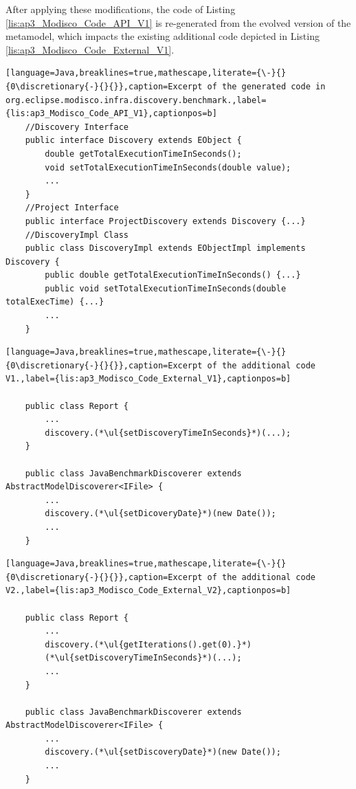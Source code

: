 After applying these modifications, the code of Listing \ref{lis:ap3_Modisco_Code_API_V1} is re-generated from the evolved version of the metamodel, which impacts the existing additional code depicted in Listing \ref{lis:ap3_Modisco_Code_External_V1}. 

\begin{lstlisting}[language=Java,breaklines=true,mathescape,literate={\-}{}{0\discretionary{-}{}{}},caption=Excerpt of the generated code in org.eclipse.modisco.infra.discovery.benchmark.,label={lis:ap3_Modisco_Code_API_V1},captionpos=b]
	//Discovery Interface
	public interface Discovery extends EObject {
		double getTotalExecutionTimeInSeconds();
		void setTotalExecutionTimeInSeconds(double value);
		...
	}
	//Project Interface
	public interface ProjectDiscovery extends Discovery {...}
	//DiscoveryImpl Class
	public class DiscoveryImpl extends EObjectImpl implements Discovery {
		public double getTotalExecutionTimeInSeconds() {...}
		public void setTotalExecutionTimeInSeconds(double totalExecTime) {...}
		...
	}
\end{lstlisting}
\begin{lstlisting}[language=Java,breaklines=true,mathescape,literate={\-}{}{0\discretionary{-}{}{}},caption=Excerpt of the additional code V1.,label={lis:ap3_Modisco_Code_External_V1},captionpos=b]
	
	public class Report {
		...
		discovery.(*\ul{setDiscoveryTimeInSeconds}*)(...);
	}
	
	public class JavaBenchmarkDiscoverer extends AbstractModelDiscoverer<IFile> {
		...
		discovery.(*\ul{setDicoveryDate}*)(new Date());
		...
	} 
\end{lstlisting}


\begin{lstlisting}[language=Java,breaklines=true,mathescape,literate={\-}{}{0\discretionary{-}{}{}},caption=Excerpt of the additional code V2.,label={lis:ap3_Modisco_Code_External_V2},captionpos=b]
	
	public class Report {
		...
		discovery.(*\ul{getIterations().get(0).}*) 
		(*\ul{setDiscoveryTimeInSeconds}*)(...);
		...
	}
	
	public class JavaBenchmarkDiscoverer extends AbstractModelDiscoverer<IFile> {
		...
		discovery.(*\ul{setDiscoveryDate}*)(new Date());
		...
	}
\end{lstlisting}





